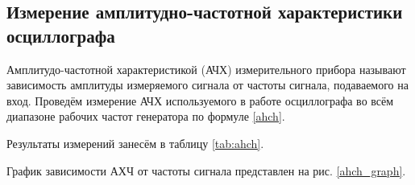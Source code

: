\documentclass[a4paper,12pt]{article} %
\begin{document}
\subsection{Измерение амплитудно-частотной характеристики осциллографа}

Амплитудо-частотной характеристикой (АЧХ) измерительного прибора называют зависимость амплитуды измеряемого
сигнала от частоты сигнала, подаваемого на вход. Проведём измерение АЧХ используемого в работе осциллографа во всём диапазоне
рабочих частот генератора по формуле \eqref{ahch}.

Результаты измерений занесём в таблицу \ref{tab:ahch}.

График зависимости АХЧ от частоты сигнала представлен на рис. \ref{ahch_graph}.

\end{document}
